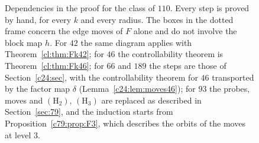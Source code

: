 \begin{figure}[t]
\caption{Dependencies in the proof for the class of $110$. Every step is proved by hand, for every $k$ and every radius. The boxes in the dotted frame concern the edge moves of $F$ alone and do not involve the block map $h$. For $42$ the same diagram applies with Theorem~\ref{cl:thm:Fk42}; for $46$ the controllability theorem is Theorem~\ref{cl:thm:Fk46}; for $66$ and $189$ the steps are those of Section~\ref{c24:sec}, with the controllability theorem for $46$ transported by the factor map $\delta$ (Lemma~\ref{c24:lem:moves46}); for $93$ the probes, moves and $(\mathrm H_2)$, $(\mathrm H_3)$ are replaced as described in Section~\ref{sec:79}, and the induction starts from Proposition~\ref{c79:prop:F3}, which describes the orbits of the moves at level $3$.}
\label{fig:dep}
\end{figure}
